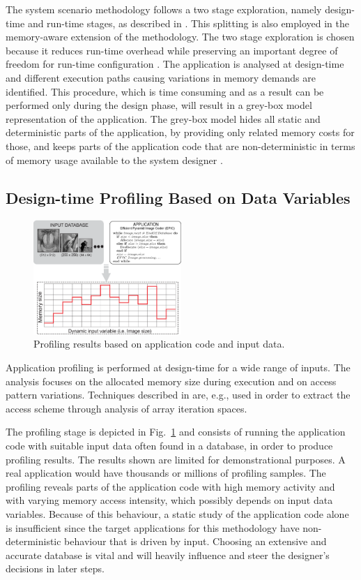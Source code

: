 \documentclass[a4paper,conference]{IEEEtran}
\begin{document}
The system scenario methodology follows a two stage exploration, namely design-time and run-time stages, as described in \cite{Gheorghita2007}. This splitting is also employed in the memory-aware extension of the methodology. The two stage exploration is chosen because it reduces run-time overhead while preserving an important degree of freedom for run-time configuration \cite{tcm}. The application is analysed at design-time and different execution paths causing variations in memory demands are identified. This procedure, which is time consuming and as a result can be performed only during the design phase, will result in a grey-box model representation of the application. The grey-box model hides all static and deterministic parts of the application, by providing only related memory costs for those, and keeps parts of the application code that are non-deterministic in terms of memory usage available to the system designer \cite{graybox}. 


\subsection{Design-time Profiling Based on Data Variables}

\begin{figure}[!t]
\centering
\includegraphics[width=0.50\textwidth]{Images/profiling2.eps}
\caption{Profiling results based on application code and input data.}
\label{fig:profiling}
\end{figure}

Application profiling is performed at design-time for a wide range of inputs. The analysis focuses on the allocated memory size during execution and on access pattern variations. Techniques described in \cite{Ang13b} are, e.g., used in order to extract the access scheme through analysis of array iteration spaces.  

The profiling stage is depicted in Fig.~\ref{fig:profiling} and consists of running the application code with suitable input data often found in a database, in order to produce profiling results. The results shown are limited for demonstrational purposes. A real application would have thousands or millions of profiling samples. The profiling reveals parts of the application code with high memory activity and with varying memory access intensity, which possibly depends on input data variables. Because of this behaviour, a static study of the application code alone is insufficient since the target applications for this methodology have non-deterministic behaviour that is driven by input. Choosing an extensive and accurate database is vital and will heavily influence and steer the designer's decisions in later steps. 
\end{document}

